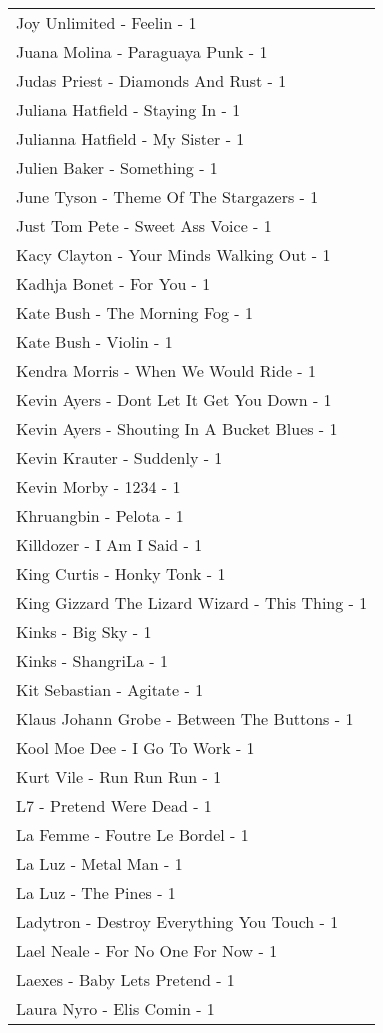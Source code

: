 \documentclass[
]{article}
\begin{document}
\begin{longtable}{l}
Joy Unlimited - Feelin - 1 \\ 
Juana Molina - Paraguaya Punk - 1 \\ 
Judas Priest - Diamonds And Rust - 1 \\ 
Juliana Hatfield - Staying In - 1 \\ 
Julianna Hatfield - My Sister - 1 \\ 
Julien Baker - Something - 1 \\ 
June Tyson - Theme Of The Stargazers - 1 \\ 
Just Tom Pete - Sweet Ass Voice - 1 \\ 
Kacy Clayton - Your Minds Walking Out - 1 \\ 
Kadhja Bonet - For You - 1 \\ 
Kate Bush - The Morning Fog - 1 \\ 
Kate Bush - Violin - 1 \\ 
Kendra Morris - When We Would Ride - 1 \\ 
Kevin Ayers - Dont Let It Get You Down - 1 \\ 
Kevin Ayers - Shouting In A Bucket Blues - 1 \\ 
Kevin Krauter - Suddenly - 1 \\ 
Kevin Morby - 1234 - 1 \\ 
Khruangbin - Pelota - 1 \\ 
Killdozer - I Am I Said - 1 \\ 
King Curtis - Honky Tonk - 1 \\ 
King Gizzard The Lizard Wizard - This Thing - 1 \\ 
Kinks - Big Sky - 1 \\ 
Kinks - ShangriLa - 1 \\ 
Kit Sebastian - Agitate - 1 \\ 
Klaus Johann Grobe - Between The Buttons - 1 \\ 
Kool Moe Dee - I Go To Work - 1 \\ 
Kurt Vile - Run Run Run - 1 \\ 
L7 - Pretend Were Dead - 1 \\ 
La Femme - Foutre Le Bordel - 1 \\ 
La Luz - Metal Man - 1 \\ 
La Luz - The Pines - 1 \\ 
Ladytron - Destroy Everything You Touch - 1 \\ 
Lael Neale - For No One For Now - 1 \\ 
Laexes - Baby Lets Pretend - 1 \\ 
Laura Nyro - Elis Comin - 1 \\ 

\end{longtable}
\end{document}
